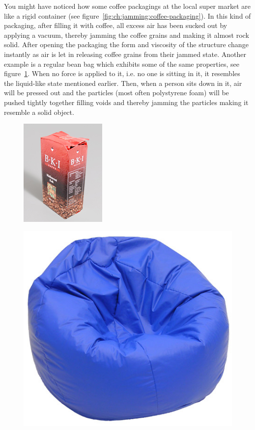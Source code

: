 You might have noticed how some coffee packagings at the local super market are like a rigid container (see figure~\ref{fig:ch:jamming:coffee-packaging}). 
In this kind of packaging, after filling it with coffee, all excess air has been sucked out by applying a vacuum, thereby jamming the coffee grains and making it almost rock solid. 
After opening the packaging the form and viscosity of the structure change instantly as air is let in releasing coffee grains from their jammed state.
Another example is a regular bean bag which exhibits some of the same properties, see figure~\ref{fig:ch:jamming:bean-bag}. 
When no force is applied to it, i.e. no one is sitting in it, it resembles the liquid-like state mentioned earlier. 
Then, when a person sits down in it, air will be pressed out and the particles (most often polystyrene foam) will be pushed tightly together filling voids and thereby jamming the particles making it resemble a solid object.

\begin{figure}[h]
\centering
\begin{minipage}[t]{.44\textwidth}
  \centering
  \includegraphics[width=.5\linewidth]{figures/jamming/coffee_packaging}
  \label{fig:ch:jamming:coffee-packaging}
\end{minipage}%
\hspace{0.02\textwidth}
\begin{minipage}[t]{.44\textwidth}
  \centering
  \includegraphics[width=.5\linewidth]{figures/jamming/bean_bag}
  \label{fig:ch:jamming:bean-bag}
\end{minipage}
\end{figure}

